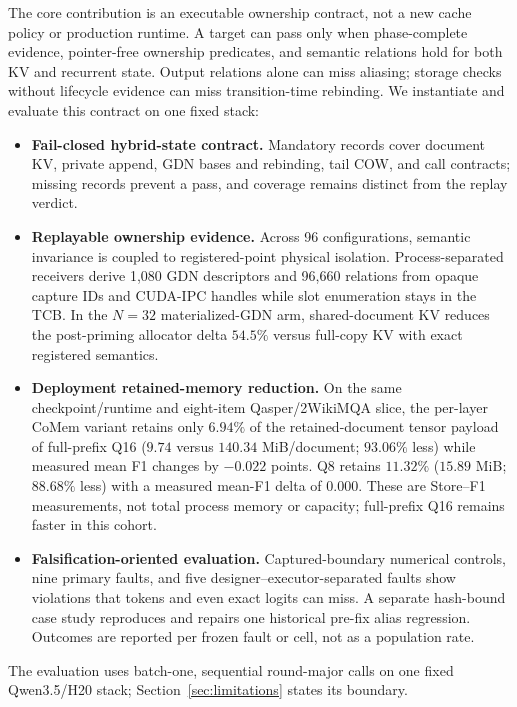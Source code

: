 \documentclass{article}
\begin{document}
The core contribution is an executable ownership contract, not a new cache policy
or production runtime.  A target can pass only when phase-complete evidence,
pointer-free ownership predicates, and semantic relations hold for both KV and
recurrent state.  Output relations alone can miss aliasing; storage checks
without lifecycle evidence can miss transition-time rebinding.  We instantiate
and evaluate this contract on one fixed stack:
\begin{itemize}
  \setlength{\itemsep}{1pt}
  \setlength{\parskip}{0pt}
  \item \textbf{Fail-closed hybrid-state contract.} Mandatory records cover
  document KV, private append, GDN bases and rebinding, tail COW, and call
  contracts; missing records prevent a pass, and coverage remains distinct
  from the replay verdict.
  \item \textbf{Replayable ownership evidence.} Across 96 configurations,
  semantic invariance is coupled to registered-point physical isolation.
  Process-separated receivers derive 1,080 GDN descriptors and 96,660 relations
  from opaque capture IDs and CUDA-IPC handles while slot enumeration stays in
  the TCB.  In the $N=32$ materialized-GDN arm, shared-document KV reduces the
  post-priming allocator delta $54.5\%$ versus full-copy KV with exact registered
  semantics.
  \item \textbf{Deployment retained-memory reduction.} On the same
  checkpoint/runtime and eight-item Qasper/2WikiMQA slice, the per-layer CoMem
  variant retains only $6.94\%$ of the retained-document tensor payload of full-prefix Q16
  ($9.74$ versus $140.34$ MiB/document; $93.06\%$ less) while measured mean F1
  changes by $-0.022$ points.  Q8 retains $11.32\%$ ($15.89$ MiB; $88.68\%$
  less) with a measured mean-F1 delta of $0.000$.  These are Store--F1
  measurements, not total process memory or capacity; full-prefix Q16 remains
  faster in this cohort.
  \item \textbf{Falsification-oriented evaluation.} Captured-boundary numerical
  controls, nine primary faults, and five designer--executor-separated faults
  show violations that tokens and even exact logits can miss.  A separate
  hash-bound case study reproduces and repairs one historical pre-fix alias
  regression.  Outcomes are reported per frozen fault or cell, not as a
  population rate.
\end{itemize}

The evaluation uses batch-one, sequential round-major calls on one fixed
Qwen3.5/H20 stack; Section~\ref{sec:limitations} states its boundary.
\end{document}
